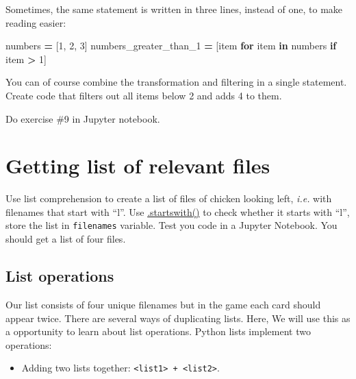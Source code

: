 \documentclass[
]{book}
\newenvironment{Shaded}{\begin{snugshade}}{\end{snugshade}}
\newcommand{\ControlFlowTok}[1]{\textcolor[rgb]{0.13,0.29,0.53}{\textbf{#1}}}
\newcommand{\DecValTok}[1]{\textcolor[rgb]{0.00,0.00,0.81}{#1}}
\newcommand{\KeywordTok}[1]{\textcolor[rgb]{0.13,0.29,0.53}{\textbf{#1}}}
\newcommand{\NormalTok}[1]{#1}
\newcommand{\OperatorTok}[1]{\textcolor[rgb]{0.81,0.36,0.00}{\textbf{#1}}}
\providecommand{\tightlist}{%
  \setlength{\itemsep}{0pt}\setlength{\parskip}{0pt}}
\begin{document}
Sometimes, the same statement is written in three lines, instead of one, to make reading easier:

\begin{Shaded}
\begin{Highlighting}[]
\NormalTok{numbers }\OperatorTok{=}\NormalTok{ [}\DecValTok{1}\NormalTok{, }\DecValTok{2}\NormalTok{, }\DecValTok{3}\NormalTok{]}
\NormalTok{numbers\_greater\_than\_1 }\OperatorTok{=}\NormalTok{ [item }
                          \ControlFlowTok{for}\NormalTok{ item }\KeywordTok{in}\NormalTok{ numbers}
                          \ControlFlowTok{if}\NormalTok{ item }\OperatorTok{\textgreater{}} \DecValTok{1}\NormalTok{]}
\end{Highlighting}
\end{Shaded}

You can of course combine the transformation and filtering in a single statement. Create code that filters out all items below 2 and adds 4 to them.

Do exercise \#9 in Jupyter notebook.

\hypertarget{getting-list-of-relevant-files}{%
\section{Getting list of relevant files}\label{getting-list-of-relevant-files}}

Use list comprehension to create a list of files of chicken looking left, \emph{i.e.} with filenames that start with ``l''. Use \href{https://docs.python.org/3/library/stdtypes.html\#str.startswith}{.startswith()} to check whether it starts with ``l'', store the list in \texttt{filenames} variable. Test you code in a Jupyter Notebook. You should get a list of four files.

\hypertarget{list-operations}{%
\subsection{List operations}\label{list-operations}}

Our list consists of four unique filenames but in the game each card should appear twice. There are several ways of duplicating lists. Here, We will use this as a opportunity to learn about list operations. Python lists implement two operations:

\begin{itemize}
\tightlist
\item
  Adding two lists together: \texttt{\textless{}list1\textgreater{}\ +\ \textless{}list2\textgreater{}}.
\end{itemize}
\end{document}
